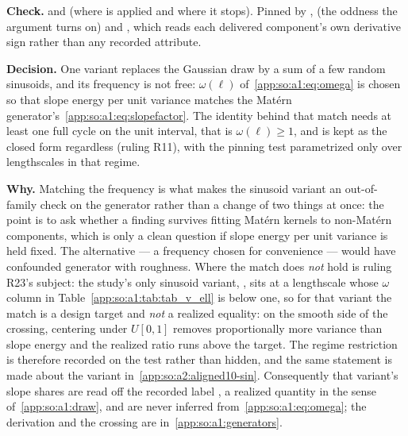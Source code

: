 \begin{sloppypar}
\textbf{Check.}  and
 (where  is applied and where it
stops). Pinned by
,
 (the
oddness the argument turns on) and
, which
reads each delivered component's own derivative sign rather than any recorded
attribute.
\end{sloppypar}

\label{app:so:a4:d5}

\textbf{Decision.} One variant replaces the Gaussian draw by a sum of a few
random sinusoids, and its frequency is not free: $\omega(\ell)$
of~\eqref{app:so:a1:eq:omega} is chosen so that slope energy per unit variance
matches the Mat\'ern generator's~\eqref{app:so:a1:eq:slopefactor}. The identity
behind that match needs at least one full cycle on the unit interval, that is
$\omega(\ell)\ge1$, and  is kept as the closed
form regardless (ruling R11), with the pinning test parametrized only over
lengthscales in that regime.

\textbf{Why.} Matching the frequency is what makes the sinusoid variant an
out-of-family check on the generator rather than a change of two things at
once: the point is to ask whether a finding survives fitting Mat\'ern kernels
to non-Mat\'ern components, which is only a clean question if slope energy per
unit variance is held fixed. The
alternative --- a frequency chosen for convenience --- would have confounded
generator with roughness. Where the match does \emph{not} hold is ruling R23's
subject: the study's only sinusoid variant, , sits at a
lengthscale whose $\omega$ column in Table~\ref{app:so:a1:tab:tab_v_ell} is
below one, so for that variant the match
is a design target and \emph{not} a realized equality: on the smooth side of
the crossing, centering under $U[0,1]$ removes proportionally more variance
than slope energy and the realized ratio runs above the target. The regime
restriction is therefore recorded on the test rather than hidden, and the same
statement is made about the variant in~\ref{app:so:a2:aligned10-sin}.
Consequently that variant's slope shares are read off the recorded label
, a realized quantity in the sense of~\ref{app:so:a1:draw},
and are never inferred from~\eqref{app:so:a1:eq:omega}; the derivation and the
crossing are in~\ref{app:so:a1:generators}.

